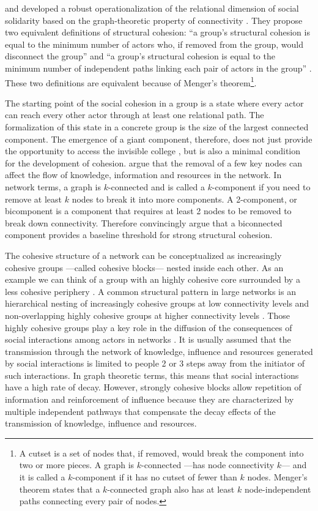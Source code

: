 \citet{white:2001} and \citet{moody:2003} developed a robust operationalization of the relational dimension of social solidarity based on the graph-theoretic property of connectivity \citep{harary:1969}. They propose two equivalent definitions of structural cohesion: ``a group's structural cohesion is equal to the minimum number of actors who, if removed from the group, would disconnect the group'' and ``a group's structural cohesion is equal to the minimum number of independent paths linking each pair of actors in the group'' \citep[109]{moody:2003}. These two definitions are equivalent because of Menger's theorem\footnote{A cutset is a set of nodes that, if removed, would break the component into two or more pieces. A graph is $k$-connected ---has node connectivity $k$--- and it is called a $k$-component if it has no cutset of fewer than $k$ nodes. Menger's theorem states that a $k$-connected graph also has at least $k$ node-independent paths connecting every pair of nodes.}.

The starting point of the social cohesion in a group is a state where every actor can reach every other actor through at least one relational path. The formalization of this state in a concrete group is the size of the largest connected component. The emergence of a giant component, therefore, does not just provide the opportunity to access the invisible college \citep{guimera:2005}, but is also a minimal condition for the development of cohesion. \citet{moody:2003} argue that the removal of a few key nodes can affect the flow of knowledge, information and resources in the network. In network terms, a graph is $k$-connected and is called a $k$-component if you need to remove at least $k$ nodes to break it into more components. A 2-component, or bicomponent is a component that requires at least 2 nodes to be removed to break down connectivity.  Therefore \citet{moody:2003} convincingly argue that a biconnected component provides a baseline threshold for strong structural cohesion.

The cohesive structure of a network can be conceptualized as increasingly cohesive groups ---called cohesive blocks--- nested inside each other. As an example we can think of a group with an highly cohesive core surrounded by a less cohesive periphery \citep{borgatti:2000}. A common structural pattern in large networks is an hierarchical nesting of increasingly cohesive groups at low connectivity levels and non-overlapping highly cohesive groups at higher connectivity levels \citep[112]{moody:2003}. Those highly cohesive groups play a key role in the diffusion of the consequences of social interactions among actors in networks \citep[355-356]{white:2001}. It is usually assumed that the transmission through the network of knowledge, influence and resources generated by social interactions is limited to people 2 or 3 steps away from the initiator of such interactions. In graph theoretic terms, this means that social interactions have a high rate of decay. However, strongly cohesive blocks allow repetition of information and reinforcement of influence because they are characterized by multiple independent pathways that compensate the decay effects of the transmission of knowledge, influence and resources.

